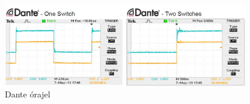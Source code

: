 \begin{figure}[H]
	\centering
	\includegraphics[width=400px, keepaspectratio] {figures/dante-clocking.jpg}
	\caption{Dante órajel}
	\label{fig:dante-clock}
\end{figure}

